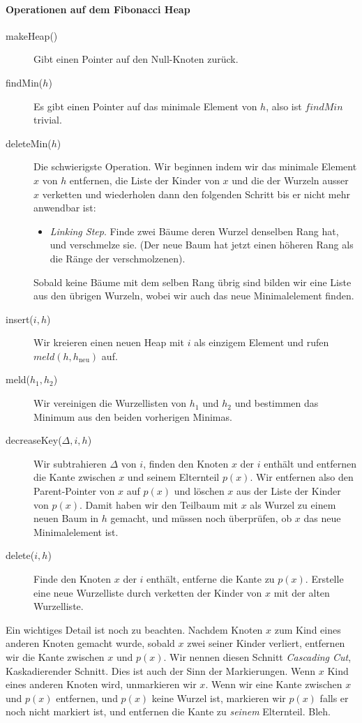 \documentclass[a4paper, 9pt, DIV=20]{scrartcl}
\begin{document}
\paragraph{Operationen auf dem Fibonacci Heap} 
\begin{description}
\item[makeHeap()] Gibt einen Pointer auf den Null-Knoten zurück.
\item[findMin($h$)] Es gibt einen Pointer auf das minimale Element von $h$, also ist $findMin$ trivial.
\item[deleteMin($h$)] Die schwierigste Operation. Wir beginnen indem wir das minimale Element $x$ von $h$ entfernen, die Liste der Kinder von $x$ und die der Wurzeln ausser $x$ verketten und wiederholen dann den folgenden Schritt bis er nicht mehr anwendbar ist:
\begin{itemize}[leftmargin=*]
\item
\emph{Linking Step}. Finde zwei Bäume deren Wurzel denselben Rang hat, und verschmelze sie. (Der neue Baum hat jetzt einen höheren Rang als die Ränge der verschmolzenen).
\end{itemize}
Sobald keine Bäume mit dem selben Rang übrig sind bilden wir eine Liste aus den übrigen Wurzeln, wobei wir auch das neue Minimalelement finden.
\item[insert($i,h$)] Wir kreieren einen neuen Heap mit $i$ als einzigem Element und rufen $meld(h, h_{\text{neu}})$ auf.
\item[meld($h_{1}, h_{2}$)] Wir vereinigen die Wurzellisten von $h_{1}$ und $h_{2}$ und bestimmen das Minimum aus den beiden vorherigen Minimas.
\item[decreaseKey($\Delta,i,h$)] Wir subtrahieren $\Delta$ von $i$, finden den Knoten $x$ der $i$ enthält und entfernen die Kante zwischen $x$ und seinem Elternteil $p(x)$. Wir entfernen also den Parent-Pointer von $x$ auf $p(x)$ und löschen $x$ aus der Liste der Kinder von $p(x)$. Damit haben wir den Teilbaum mit $x$ als Wurzel zu einem neuen Baum in $h$ gemacht, und müssen noch überprüfen, ob $x$ das neue Minimalelement ist.
\item[delete($i,h$)] Finde den Knoten $x$ der $i$ enthält, entferne die Kante zu $p(x)$. Erstelle eine neue Wurzelliste durch verketten der Kinder von $x$ mit der alten Wurzelliste.
\end{description}
Ein wichtiges Detail ist noch zu beachten. Nachdem Knoten $x$ zum Kind eines anderen Knoten gemacht wurde, sobald $x$ zwei seiner Kinder verliert, entfernen wir die Kante zwischen $x$ und $p(x)$. Wir nennen diesen Schnitt \emph{Cascading Cut}, Kaskadierender Schnitt. Dies ist auch der Sinn der Markierungen. Wenn $x$ Kind eines anderen Knoten wird, unmarkieren wir $x$. Wenn wir eine Kante zwischen $x$ und $p(x)$ entfernen, und $p(x)$ keine Wurzel ist, markieren wir $p(x)$ falls er noch nicht markiert ist, und entfernen die Kante zu \emph{seinem} Elternteil.
Bleh.
\end{document}
